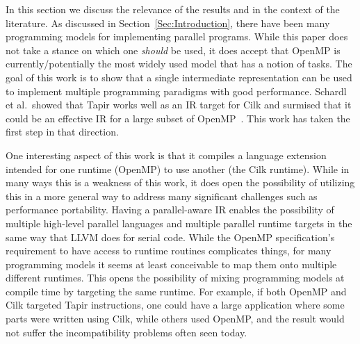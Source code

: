 \documentclass[sigconf]{acmart}
\begin{document}
In this section we discuss the relevance of the results and in the context of the
literature. As discussed in Section~\ref{Sec:Introduction}, 
there have been many programming models for implementing parallel programs. While
this paper does not take a stance on which one \emph{should} be used, it does
accept that OpenMP is currently/potentially the most widely used model that has 
a notion of tasks. The goal of this work is to show that a single intermediate
representation can be used to implement multiple programming paradigms with
good performance. Schardl et al.\ showed that Tapir works well as an IR target
for Cilk and surmised that it could be an effective IR for a large subset of
  OpenMP~\cite{tapir}. This work has taken the first step in that direction.

One interesting aspect of this work is that it compiles a language extension
intended for one runtime (OpenMP) to use another (the Cilk runtime). While in
many ways this is a weakness of this work, it does open the possibility of
utilizing this in a more general way to address many significant challenges
such as performance portability. Having a parallel-aware IR enables the
possibility of multiple high-level parallel languages and multiple parallel
runtime targets in the same way that LLVM does for serial code. While the
OpenMP specification's requirement to have access to runtime routines
complicates things, for many programming models it seems at least conceivable
to map them onto multiple different runtimes. This opens the possibility of
mixing programming models at compile time by targeting the same runtime. For
example, if both OpenMP and Cilk targeted Tapir instructions, one could have a
large application where some parts were written using Cilk, while others used
OpenMP, and the result would not suffer the incompatibility problems often
seen today.
\end{document}
